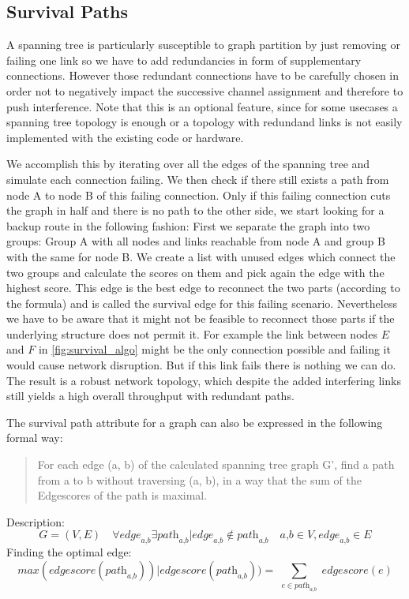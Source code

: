     \subsection{Survival Paths}
      A spanning tree is particularly susceptible to graph partition by just removing or failing one link so we have to add redundancies in form of supplementary connections.
      However those redundant connections have to be carefully chosen in order not to negatively impact the successive channel assignment and therefore to push interference.
      Note that this is an optional feature, since for some usecases a spanning tree topology is enough or a topology with redundand links is not easily implemented
      with the existing code or hardware.  
      
      We accomplish this by iterating over all the edges of the spanning tree and simulate each connection failing. 
      We then check if there still exists a path from node A to node B of this failing connection. 
      Only if this failing connection cuts the graph in half and there is no path to the other side,
      we start looking for a backup route in the following fashion:
      First we separate the graph into two groups: Group A with all nodes and links reachable from node A and group B with the same for node B.
      We create a list with unused edges which connect the two groups and calculate the scores on them and pick again the edge with the highest score.
      This edge is the best edge to reconnect the two parts (according to the formula) and is called the survival edge for this failing scenario.
      Nevertheless we have to be aware that it might not be feasible to reconnect those parts if the underlying structure does not permit it.
      For example the link between nodes \(E\) and \(F\) in \ref{fig:survival_algo} might be the only connection possible and failing it would cause network disruption.
      But if this link fails there is nothing we can do. The result is a robust network topology, 
      which despite the added interfering links still yields a high overall throughput with redundant paths.

      The survival path attribute for a graph can also be expressed in the following formal way:
      \begin{quote}
	For each edge (a, b) of the calculated spanning tree graph G', find a path from a to b without traversing (a, b), 
	in a way that the sum of the Edgescores of the path is maximal.
      \end{quote}
      Description:
      $$\textit{G}=(\textit{V},\textit{E}) \quad
	\forall \textit{edge}_\textit{a,b} \exists \textit{path}_\textit{a,b} | \textit{edge}_\textit{a,b} \notin \textit{path}_\textit{a,b} \quad
	\textit{a,b} \in \textit{V}, \textit{edge}_\textit{a,b} \in \textit{E}$$
	Finding the optimal edge:
	$$\textit{max}(\textit{edgescore}(\textit{path}_\textit{a,b})) |
	\textit{edgescore}(\textit{path}_\textit{a,b})) = \sum_{\substack{e \in \textit{path}_\textit{a,b}}} \textit{edgescore}(e)$$
	
